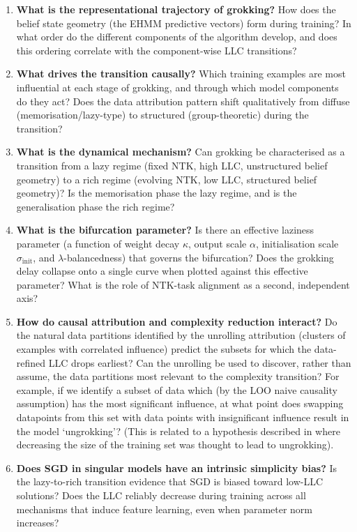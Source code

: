 \documentclass[11pt,a4paper]{article}
\begin{document}
\begin{enumerate}[label=\textbf{RQ\arabic*.}, leftmargin=2.5em]
    \item \textbf{What is the representational trajectory of grokking?} How does the belief state geometry (the EHMM predictive vectors) form during training? In what order do the different components of the algorithm develop, and does this ordering correlate with the component-wise LLC transitions?

    \item \textbf{What drives the transition causally?} Which training examples are most influential at each stage of grokking, and through which model components do they act? Does the data attribution pattern shift qualitatively from diffuse (memorisation/lazy-type) to structured (group-theoretic) during the transition?

    \item \textbf{What is the dynamical mechanism?} Can grokking be characterised as a transition from a lazy regime (fixed NTK, high LLC, unstructured belief geometry) to a rich regime (evolving NTK, low LLC, structured belief geometry)? Is the memorisation phase the lazy regime, and is the generalisation phase the rich regime?

    \item \textbf{What is the bifurcation parameter?} Is there an effective laziness parameter (a function of weight decay $\kappa$, output scale $\alpha$, initialisation scale $\sigma_{\mathrm{init}}$, and $\lambda$-balancedness) that governs the bifurcation? Does the grokking delay collapse onto a single curve when plotted against this effective parameter? What is the role of NTK-task alignment as a second, independent axis?

    \item \textbf{How do causal attribution and complexity reduction interact?} Do the natural data partitions identified by the unrolling attribution (clusters of examples with correlated influence) predict the subsets for which the data-refined LLC drops earliest? Can the unrolling be used to discover, rather than assume, the data partitions most relevant to the complexity transition? For example, if we identify a subset of data which (by the LOO naive causality assumption) has the most significant influence, at what point does swapping datapoints from this set with data points with insignificant influence result in the model `ungrokking'? (This is related to a hypothesis described in \citep{varma2023explaining} where decreasing the size of the training set was thought to lead to ungrokking).

    \item \textbf{Does SGD in singular models have an intrinsic simplicity bias?} Is the lazy-to-rich transition evidence that SGD is biased toward low-LLC solutions? Does the LLC reliably decrease during training across all mechanisms that induce feature learning, even when parameter norm increases?
\end{enumerate}
\end{document}
